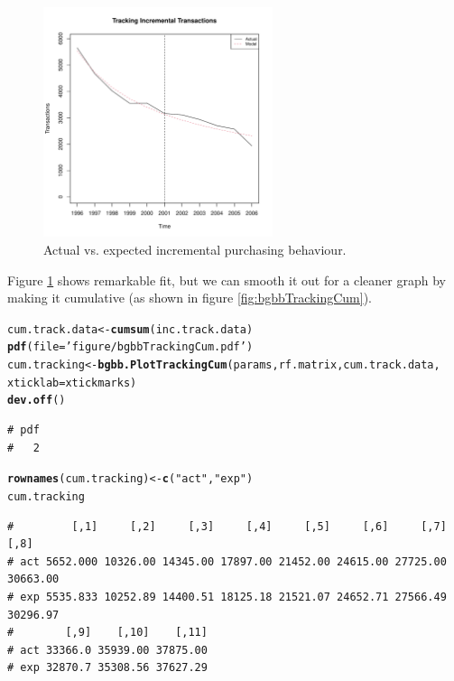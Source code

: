 \documentclass[10pt, letterpaper, onecolumn, oneside, final]{article}\usepackage[]{graphicx}\usepackage[]{color}
\makeatletter
\newcommand{\hlstr}[1]{\textcolor[rgb]{0.192,0.494,0.8}{#1}}%
\newcommand{\hlstd}[1]{\textcolor[rgb]{0.345,0.345,0.345}{#1}}%
\newcommand{\hlkwb}[1]{\textcolor[rgb]{0.69,0.353,0.396}{#1}}%
\newcommand{\hlkwc}[1]{\textcolor[rgb]{0.333,0.667,0.333}{#1}}%
\newcommand{\hlkwd}[1]{\textcolor[rgb]{0.737,0.353,0.396}{\textbf{#1}}}%
\newenvironment{kframe}{%
 \def\at@end@of@kframe{}%
 \ifinner\ifhmode%
  \def\at@end@of@kframe{\end{minipage}}%
  \begin{minipage}{\columnwidth}%
 \fi\fi%
 \def\FrameCommand##1{\hskip\@totalleftmargin \hskip-\fboxsep
 \colorbox{shadecolor}{##1}\hskip-\fboxsep
     \hskip-\linewidth \hskip-\@totalleftmargin \hskip\columnwidth}%
 \MakeFramed {\advance\hsize-\width
   \@totalleftmargin\z@ \linewidth\hsize
   \@setminipage}}%
 {\par\unskip\endMakeFramed%
 \at@end@of@kframe}
\newenvironment{knitrout}{}{} %
\makeatother
\begin{document}
\begin{figure}
  \begin{center}
  \includegraphics[width=0.6\textwidth]{figure/bgbbTrackingInc}
  \caption{Actual vs. expected incremental purchasing behaviour.}\label{fig:bgbbTrackingInc}
  \end{center}
\end{figure}

Figure \ref{fig:bgbbTrackingInc} shows remarkable fit, but we can
smooth it out for a cleaner graph by making it cumulative (as shown in
figure \ref{fig:bgbbTrackingCum}).

\begin{knitrout}\small
{}\color{fgcolor}\begin{kframe}
\begin{alltt}
\hlstd{cum.track.data} \hlkwb{<-} \hlkwd{cumsum}\hlstd{(inc.track.data)}
\hlkwd{pdf}\hlstd{(}\hlkwc{file} \hlstd{=} \hlstr{'figure/bgbbTrackingCum.pdf'}\hlstd{)}
\hlstd{cum.tracking} \hlkwb{<-} \hlkwd{bgbb.PlotTrackingCum}\hlstd{(params, rf.matrix, cum.track.data,}
                                     \hlkwc{xticklab} \hlstd{= xtickmarks)}
\hlkwd{dev.off}\hlstd{()}
\end{alltt}
\begin{verbatim}
# pdf 
#   2
\end{verbatim}
\begin{alltt}
\hlkwd{rownames}\hlstd{(cum.tracking)} \hlkwb{<-} \hlkwd{c}\hlstd{(}\hlstr{"act"}\hlstd{,} \hlstr{"exp"}\hlstd{)}
\hlstd{cum.tracking}
\end{alltt}
\begin{verbatim}
#         [,1]     [,2]     [,3]     [,4]     [,5]     [,6]     [,7]     [,8]
# act 5652.000 10326.00 14345.00 17897.00 21452.00 24615.00 27725.00 30663.00
# exp 5535.833 10252.89 14400.51 18125.18 21521.07 24652.71 27566.49 30296.97
#        [,9]    [,10]    [,11]
# act 33366.0 35939.00 37875.00
# exp 32870.7 35308.56 37627.29
\end{verbatim}
\end{kframe}
\end{knitrout}
\end{document}
